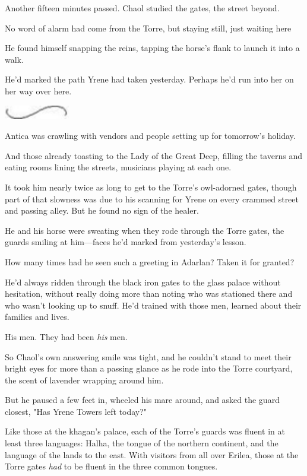 Another fifteen minutes passed. Chaol studied the gates, the street beyond.

No word of alarm had come from the Torre, but staying still, just waiting here



He found himself snapping the reins, tapping the horse's flank to launch it into a walk.

He'd marked the path Yrene had taken yesterday. Perhaps he'd run into her on her way over here.

\includegraphics[width=1.12in,height=0.24in]{images/seperator}

Antica was crawling with vendors and people setting up for tomorrow's holiday.

And those already toasting to the Lady of the Great Deep, filling the taverns and eating rooms lining the streets, musicians playing at each one.

It took him nearly twice as long to get to the Torre's owl-adorned gates, though part of that slowness was due to his scanning for Yrene on every crammed street and passing alley. But he found no sign of the healer.

He and his horse were sweating when they rode through the Torre gates, the guards smiling at him---faces he'd marked from yesterday's lesson.

How many times had he seen such a greeting in Adarlan? Taken it for granted?

He'd always ridden through the black iron gates to the glass palace without hesitation, without really doing more than noting who was stationed there and who wasn't looking up to snuff. He'd trained with those men, learned about their families and lives.

His men. They had been \emph{his} men.

So Chaol's own answering smile was tight, and he couldn't stand to meet their bright eyes for more than a passing glance as he rode into the Torre courtyard, the scent of lavender wrapping around him.

But he paused a few feet in, wheeled his mare around, and asked the guard closest, "Has Yrene Towers left today?"

Like those at the khagan's palace, each of the Torre's guards was fluent in at least three languages: Halha, the tongue of the northern continent, and the language of the lands to the east. With visitors from all over Erilea, those at the Torre gates \emph{had} to be fluent in the three common tongues.

